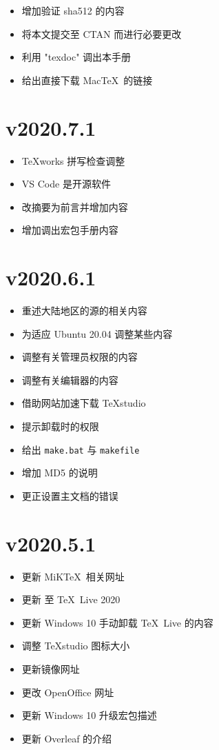 \begin{itemize}
  \item 增加验证 sha512 的内容
  \item 将本文提交至 CTAN 而进行必要更改
  \item 利用 "texdoc" 调出本手册
  \item 给出直接下载 Mac\TeX\ 的链接
\end{itemize}

\section*{v2020.7.1}

\begin{itemize}
  \item \TeX works 拼写检查调整
  \item VS Code 是开源软件
  \item 改摘要为前言并增加内容
  \item 增加调出宏包手册内容
\end{itemize}

\section*{v2020.6.1}

\begin{itemize}
  \item 重述大陆地区的源的相关内容
  \item 为适应 Ubuntu 20.04 调整某些内容
  \item 调整有关管理员权限的内容
  \item 调整有关编辑器的内容
  \item 借助网站加速下载 TeXstudio
  \item 提示卸载时的权限
  \item 给出 \texttt{make.bat} 与 \texttt{makefile}
  \item 增加 MD5 的说明
  \item 更正设置主文档的错误
\end{itemize}

\section*{v2020.5.1}

\begin{itemize}
  \item 更新 MiK\TeX\ 相关网址
  \item 更新 至 \TeX~Live 2020
  \item 更新 Windows 10 手动卸载 \TeX~Live 的内容
  \item 调整 \TeX studio 图标大小
  \item 更新镜像网址
  \item 更改 \textsf{OpenOffice} 网址
  \item 更新 Windows 10 升级宏包描述
  \item 更新 Overleaf 的介绍
\end{itemize}

